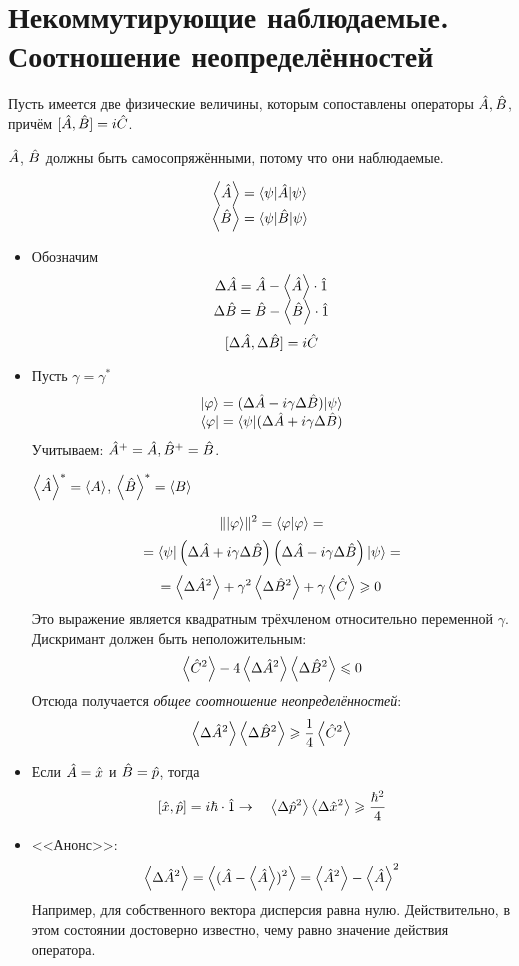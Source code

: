 \section{Некоммутирующие наблюдаемые. Соотношение неопределённостей}
Пусть имеется две физические величины, которым сопоставлены операторы $\Hat A, \Hat B$, причём $[\Hat A, \Hat B] = i \Hat C$.

\Rem $\Hat A$, $\Hat B$ должны быть самосопряжёнными, потому что они наблюдаемые.

$$
\begin{array}{c}
  \left\langle \Hat A \right\rangle = \langle \psi | \Hat A | \psi \rangle \\
  \left\langle \Hat B \right\rangle = \langle \psi | \Hat B | \psi \rangle
\end{array}
$$
\begin{itemize}
  \item Обозначим
  $$
\begin{array}{c}
  \Delta \Hat A = \Hat A - \left\langle \Hat A \right\rangle\cdot \Hat 1 \\
  \Delta \Hat B = \Hat B - \left\langle \Hat B \right\rangle\cdot \Hat 1
\end{array}
$$
    \Exercise
    $$
        [\Delta \Hat A, \Delta \Hat B] = i \Hat C
    $$
  \item Пусть $\gamma = \gamma^\ast$
  $$
  \begin{array}{c}
        | \varphi \rangle = (\Delta \Hat A - i \gamma \Delta \Hat B)| \psi \rangle \\
        \langle \varphi | = \langle \psi | (\Delta \Hat A + i \gamma \Delta \Hat B)
  \end{array}
  $$
  Учитываем: $\Hat A^+ = \Hat A, \Hat B^+ = \Hat B$.

  $\left\langle \Hat A \right\rangle^\ast = \left\langle A \right\rangle$, $\left\langle \Hat B \right\rangle^\ast = \left\langle B \right\rangle$

  $$
    \| | \varphi \rangle \|^2 = \langle \varphi | \varphi \rangle =
  $$
  $$
    = \langle \psi | \left(
        \Delta \Hat A + i \gamma \Delta \Hat B
    \right)\left(
        \Delta \Hat A - i \gamma \Delta \Hat B
    \right) | \psi \rangle =
  $$
  $$
    = \left\langle \Delta \Hat A^2 \right\rangle + \gamma^2 \left\langle \Delta \Hat B^2 \right\rangle + \gamma \left\langle \Hat C \right\rangle \geqslant 0
  $$
  Это выражение является квадратным трёхчленом относительно переменной $\gamma$. Дискримант должен быть неположительным:
  $$
    \left\langle \Hat C^2 \right\rangle - 4 \left\langle \Delta \Hat A^2 \right\rangle \left\langle \Delta \Hat B^2 \right\rangle \leqslant 0
  $$
  Отсюда получается \emph{общее соотношение неопределённостей}:
  $$
    \left\langle \Delta \Hat A^2 \right\rangle \left\langle \Delta \Hat B^2 \right\rangle \geqslant \dfrac{1}{4} \left\langle \Hat C^2 \right\rangle
  $$
\end{itemize}
\Rem
\begin{itemize}
  \item Если $\Hat A = \Hat x$ и $\Hat B = \Hat p$, тогда 
  $$
    [\Hat x, \Hat p] = i \hbar \cdot \Hat 1 \to \quad \left\langle \Delta \Hat p^2 \right\rangle \left\langle \Delta \Hat x^2 \right\rangle \geqslant \dfrac{\hbar^2}{4}
  $$
  \item <<Анонс>>:
  $$
    \left\langle \Delta \Hat A^2 \right\rangle = \left\langle  ( \Hat A - \left\langle \Hat A \right\rangle )^2  \right\rangle = \left\langle \Hat A^2 \right\rangle - \left\langle \Hat A \right\rangle^2
  $$
  Например, для собственного вектора дисперсия равна нулю. Действительно, в этом состоянии достоверно известно, чему равно значение действия оператора.
\end{itemize}

